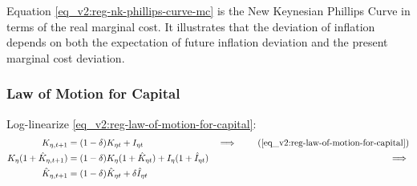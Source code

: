 \documentclass[../thesis.tex]{subfiles}
\begin{document}
Equation \ref{eq_v2:reg-nk-phillips-curve-mc} is the New Keynesian Phillips Curve in terms of the real marginal cost. It illustrates that the deviation of inflation depends on both the expectation of future inflation deviation and the present marginal cost deviation.


\subsubsection*{Law of Motion for Capital}

Log-linearize \ref{eq_v2:reg-law-of-motion-for-capital}:
	\begin{alignat}{2}
		K_{\eta, t+1} &= (1-\delta)K_{\eta t} + I_{\eta t} &\implies \tag{\ref{eq_v2:reg-law-of-motion-for-capital}} \\
		K_{\eta} (1 + \hat{K}_{\eta, t+1}) &= (1-\delta) K_{\eta} (1 + \hat{K}_{\eta t}) + I_{\eta} (1 + \hat{I}_{\eta t}) &\implies \nonumber \\
		\hat{K}_{\eta, t+1} &= (1-\delta) \hat{K}_{\eta t} + \delta \hat{I}_{\eta t} \label{eq_v2:reg-ll-law-of-motion-for-capital}
	\end{alignat}

\end{document}
